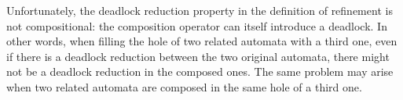 \documentclass[runningheads]{llncs}
\begin{document}

Unfortunately, the deadlock reduction property in the definition of refinement is not compositional: the composition operator can itself introduce a deadlock. In other words, when filling the hole of two related automata with a third one, even if there is a deadlock reduction between the two original automata, there might not be a deadlock reduction in the composed ones. The same problem may arise when two related automata are composed in the same hole of a third one. 
\end{document}
